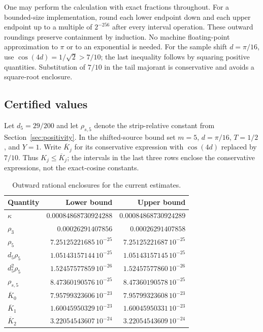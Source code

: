 One may perform the calculation with exact fractions throughout.
For a bounded-size implementation, round each lower endpoint down and
each upper endpoint up to a multiple of $2^{-256}$ after every interval
operation. These outward roundings preserve containment by induction.
No machine floating-point approximation to $\pi$ or to an exponential
is needed. For the sample shift $d=\pi/16$, use
$\cos(4d)=1/\sqrt2>7/10$; the last inequality follows by squaring
positive quantities. Substitution of $7/10$ in the tail majorant is
conservative and avoids a square-root enclosure.

\subsection{Certified values}

Let $d_5=29/200$ and let $\rho_{s,5}$ denote the strip-relative constant
from Section~\ref{sec:positivity}. In the shifted-source bound set
$m=5$, $d=\pi/16$, $T=1/2$, and $Y=1$. Write $\overline K_j$ for its
conservative expression with $\cos(4d)$ replaced by $7/10$.
Thus $K_j\le\overline K_j$; the intervals in the last three rows
enclose the conservative expressions, not the exact-cosine constants.

\begin{table}[htbp]
\centering
\caption{Outward rational enclosures for the current estimates.}
\label{tab:constants}
\begin{tabular}{@{}lrr@{}}
\toprule
Quantity & Lower bound & Upper bound\\
\midrule
$\kappa$ & $0.00084868730924288$ & $0.00084868730924289$\\
$\rho_3$ & $0.00026291407856$ & $0.00026291407858$\\
$\rho_5$ & $7.25125221685\,10^{-25}$ & $7.25125221687\,10^{-25}$\\
$d_5\rho_5$ & $1.05143157144\,10^{-25}$ & $1.05143157145\,10^{-25}$\\
$d_5^2\rho_5$ & $1.52457577859\,10^{-26}$ & $1.52457577860\,10^{-26}$\\
$\rho_{s,5}$ & $8.47360190576\,10^{-25}$ & $8.47360190578\,10^{-25}$\\
$\overline K_0$ & $7.95799323606\,10^{-23}$ & $7.95799323608\,10^{-23}$\\
$\overline K_1$ & $1.60045950329\,10^{-23}$ & $1.60045950331\,10^{-23}$\\
$\overline K_2$ & $3.22054543607\,10^{-24}$ & $3.22054543609\,10^{-24}$\\
\bottomrule
\end{tabular}
\end{table}

